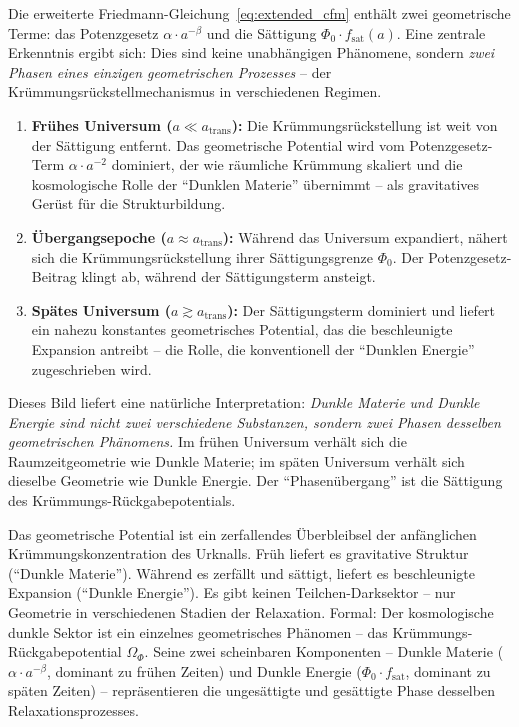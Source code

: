 \documentclass[aps,prd,twocolumn,superscriptaddress,nofootinbib]{revtex4-2}
\begin{document}
Die erweiterte Friedmann-Gleichung~\eqref{eq:extended_cfm} enth\"alt zwei geometrische Terme: das Potenzgesetz $\alpha \cdot a^{-\beta}$ und die S\"attigung $\Phi_0 \cdot f_{\mathrm{sat}}(a)$. Eine zentrale Erkenntnis ergibt sich: Dies sind keine unabh\"angigen Ph\"anomene, sondern \textit{zwei Phasen eines einzigen geometrischen Prozesses} -- der Kr\"ummungsr\"uckstellmechanismus in verschiedenen Regimen.

\begin{enumerate}
\item \textbf{Fr\"uhes Universum ($a \ll a_{\mathrm{trans}}$):} Die Kr\"ummungsr\"uckstellung ist weit von der S\"attigung entfernt. Das geometrische Potential wird vom Potenzgesetz-Term $\alpha \cdot a^{-2}$ dominiert, der wie r\"aumliche Kr\"ummung skaliert und die kosmologische Rolle der "`Dunklen Materie"' \"ubernimmt -- als gravitatives Ger\"ust f\"ur die Strukturbildung.

\item \textbf{\"Ubergangsepoche ($a \approx a_{\mathrm{trans}}$):} W\"ahrend das Universum expandiert, n\"ahert sich die Kr\"ummungsr\"uckstellung ihrer S\"attigungsgrenze $\Phi_0$. Der Potenzgesetz-Beitrag klingt ab, w\"ahrend der S\"attigungsterm ansteigt.

\item \textbf{Sp\"ates Universum ($a \gtrsim a_{\mathrm{trans}}$):} Der S\"attigungsterm dominiert und liefert ein nahezu konstantes geometrisches Potential, das die beschleunigte Expansion antreibt -- die Rolle, die konventionell der "`Dunklen Energie"' zugeschrieben wird.
\end{enumerate}

Dieses Bild liefert eine nat\"urliche Interpretation: \textit{Dunkle Materie und Dunkle Energie sind nicht zwei verschiedene Substanzen, sondern zwei Phasen desselben geometrischen Ph\"anomens.} Im fr\"uhen Universum verh\"alt sich die Raumzeitgeometrie wie Dunkle Materie; im sp\"aten Universum verh\"alt sich dieselbe Geometrie wie Dunkle Energie. Der "`Phasen\"ubergang"' ist die S\"attigung des Kr\"ummungs-R\"uckgabepotentials.

Das geometrische Potential ist ein zerfallendes \"Uberbleibsel der anf\"anglichen Kr\"ummungskonzentration des Urknalls. Fr\"uh liefert es gravitative Struktur ("`Dunkle Materie"'). W\"ahrend es zerf\"allt und s\"attigt, liefert es beschleunigte Expansion ("`Dunkle Energie"'). Es gibt keinen Teilchen-Darksektor -- nur Geometrie in verschiedenen Stadien der Relaxation. Formal: Der kosmologische dunkle Sektor ist ein einzelnes geometrisches Ph\"anomen -- das Kr\"ummungs-R\"uckgabepotential $\Omega_\Phi$. Seine zwei scheinbaren Komponenten -- Dunkle Materie ($\alpha \cdot a^{-\beta}$, dominant zu fr\"uhen Zeiten) und Dunkle Energie ($\Phi_0 \cdot f_{\mathrm{sat}}$, dominant zu sp\"aten Zeiten) -- repr\"asentieren die unges\"attigte und ges\"attigte Phase desselben Relaxationsprozesses.
\end{document}
